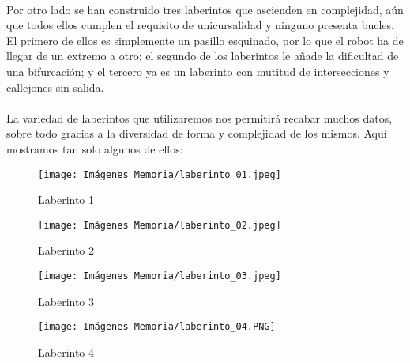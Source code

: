 \documentclass[a4paper,9pt]{article}
\begin{document}
\paragraph{}
Por otro lado se han construido tres laberintos que ascienden en complejidad, aún que todos ellos cumplen el requisito de unicursalidad y ninguno presenta bucles.
El primero de ellos es simplemente un pasillo esquinado, por lo que el robot ha de llegar de un extremo a otro; el segundo de los laberintos le añade la dificultad de una bifurcación; 
y el tercero ya es un laberinto con mutitud de intersecciones y callejones sin salida.
\paragraph{}
La variedad de laberintos que utilizaremos nos permitirá recabar muchos datos, sobre todo gracias a la diversidad de forma y complejidad de los mismos. Aquí mostramos tan solo algunos de ellos:
\begin{figure}[h!]
    \centering
    \begin{minipage}{0.45\textwidth}
        \centering
        \texttt{[image: Imágenes Memoria/laberinto\_01.jpeg]}
        \caption{Laberinto 1}
        \label{fig:laberinto 1}
    \end{minipage}%
    \hspace{0.05\textwidth} %
    \begin{minipage}{0.45\textwidth}
        \centering
        \texttt{[image: Imágenes Memoria/laberinto\_02.jpeg]}
        \caption{Laberinto 2}
        \label{fig:Laberinto 2}
    \end{minipage}
\end{figure}
\begin{figure}[h!]
    \centering
    \begin{minipage}{0.45\textwidth}
        \centering
        \texttt{[image: Imágenes Memoria/laberinto\_03.jpeg]}
        \caption{Laberinto 3}
        \label{fig:laberinto 3}
    \end{minipage}%
    \hspace{0.05\textwidth} %
    \begin{minipage}{0.45\textwidth}
        \centering
        \texttt{[image: Imágenes Memoria/laberinto\_04.PNG]}
        \caption{Laberinto 4}
        \label{fig:Laberinto 4}
    \end{minipage}
\end{figure}
\end{document}
